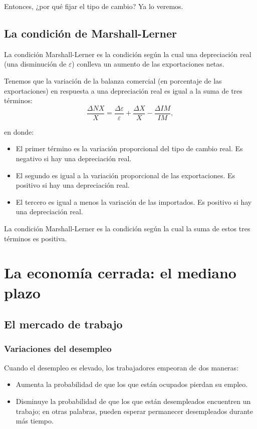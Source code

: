 \documentclass[10pt]{article}
\begin{document}
\begin{multicols*}{2}
Entonces, ¿por qué fijar el tipo de cambio? Ya lo veremos.

\subsection{La condición de Marshall-Lerner}
La condición Marshall-Lerner es la condición según la cual una depreciación real (una disminución de $\varepsilon$) conlleva un aumento de las exportaciones netas.

Tenemos que la variación de la balanza comercial (en porcentaje de las exportaciones) en respuesta a una depreciación real es igual a la suma de tres términos:
\[ \frac{\Delta\textit{NX}}{X} = \frac{\Delta\varepsilon}{\varepsilon} + \frac{\Delta X}{X} - \frac{\Delta \textit{IM}}{\textit{IM}}, \]

en donde:
\begin{itemize}
    \item El primer término es la variación proporcional del tipo de cambio real. Es negativo si hay una depreciación real.
    \item El segundo es igual a la variación proporcional de las exportaciones. Es positivo si hay una depreciación real.
    \item El tercero es igual a menos la variación de las importados. Es positivo si hay una depreciación real.
\end{itemize}

La condición Marshall-Lerner es la condición según la cual la suma de estos tres términos es positiva.

\section{La economía cerrada: el mediano plazo}
\subsection{El mercado de trabajo}
\subsubsection{Variaciones del desempleo}
Cuando el desempleo es elevado, los trabajadores empeoran de dos maneras:
\begin{itemize}
    \item Aumenta la probabilidad de que los que están ocupados pierdan su empleo.
    \item Disminuye la probabilidad de que los que están desempleados encuentren un trabajo; en otras palabras, pueden esperar permanecer desempleados durante más tiempo.
\end{itemize}

\end{multicols*}
\end{document}
